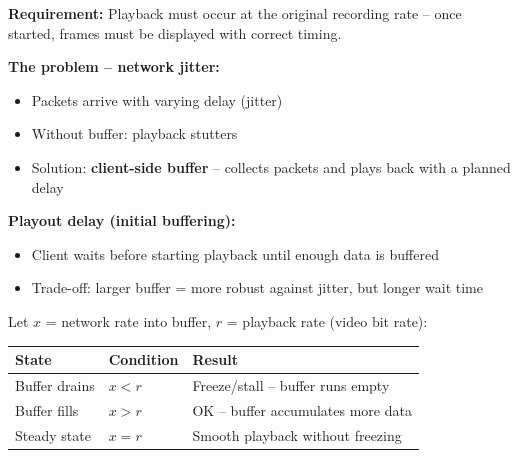 \begin{tcolorbox}[keybox, title=Continuous Playout Constraint]
\textbf{Requirement:} Playback must occur at the original recording rate -- once started, frames must be displayed with correct timing.

\medskip
\textbf{The problem -- network jitter:}
\begin{itemize}[nosep]
  \item Packets arrive with varying delay (jitter)
  \item Without buffer: playback stutters
  \item Solution: \textbf{client-side buffer} -- collects packets and plays back with a planned delay
\end{itemize}

\medskip
\textbf{Playout delay (initial buffering):}
\begin{itemize}[nosep]
  \item Client waits before starting playback until enough data is buffered
  \item Trade-off: larger buffer = more robust against jitter, but longer wait time
\end{itemize}
\end{tcolorbox}

\begin{tcolorbox}[formulabox, title=Buffering and playback rate]
Let $x$ = network rate into buffer, $r$ = playback rate (video bit rate):

\medskip
\begin{center}
\begin{tabular}{lll}
\toprule
\textbf{State} & \textbf{Condition} & \textbf{Result} \\
\midrule
Buffer drains & $x < r$ & Freeze/stall -- buffer runs empty \\
Buffer fills & $x > r$ & OK -- buffer accumulates more data \\
Steady state & $x = r$ & Smooth playback without freezing \\
\bottomrule
\end{tabular}
\end{center}
\end{tcolorbox}

